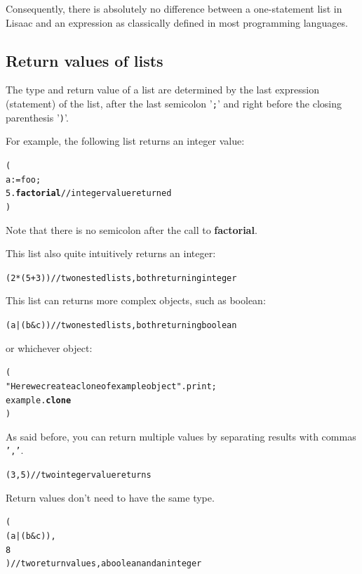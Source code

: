 \documentclass[11pt]{mybook}
\begin{document}
Consequently, there is absolutely no difference between a
one-statement list in Lisaac and an expression as classically defined
in most programming languages. 

\subsection{Return values of lists}
\label{language_reference:lists:return_value}
The type and return value of a list are determined by the last
expression (statement) of the list, after the last semicolon '{\tt ;}'
and right before the closing parenthesis '{\tt )}'.

For example, the following list returns an {\sc{}integer} value:
\begin{alltt}
  (
    a := foo;
    5.{\bf{}factorial}    // {\sc{}integer} value returned
  )
\end{alltt}

Note that there is no semicolon after the call to {\bf{}factorial}.

This list also quite intuitively returns an {\sc{}integer}:
\begin{alltt}
  (2 * (5 + 3))    // two nested lists, both returning {\sc{}integer}
\end{alltt}

This list can returns more complex objects, such as {\sc{}boolean}:
\begin{alltt}
  ( a | (b & c))   // two nested lists, both returning {\sc{}boolean}
\end{alltt}

or whichever object:
\begin{alltt}
  (
    "Here we create a clone of {\sc{}example} object".print;
    {\sc{}example}.{\bf{}clone}
  )
\end{alltt}

As said before, you can return multiple values by separating results with commas {\tt ','}.
\begin {alltt}
  ( 3, 5 )         // two {\sc{}integer} value returns
\end{alltt}

Return values don't need to have the same type.
\begin{alltt}
  (
    (a | ( b & c )),
    8
  )                // two return values, a {\sc{}boolean} and an {\sc{}integer}
\end{alltt}
\end{document}
